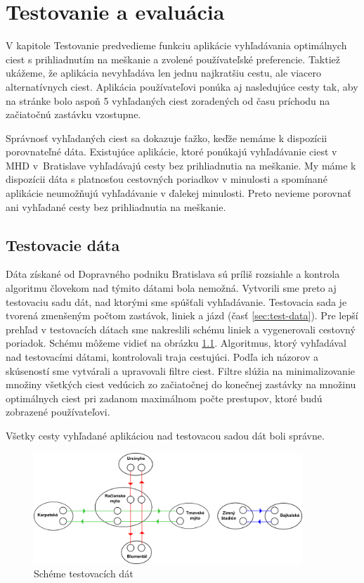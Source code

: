  \chapter{Testovanie a evaluácia}
\label{kap:tes}

V kapitole Testovanie predvedieme funkciu aplikácie vyhľadávania optimálnych ciest s prihliadnutím na meškanie a zvolené používateľské preferencie. Taktiež ukážeme, že aplikácia nevyhľadáva len jednu najkratšiu cestu, ale viacero alternatívnych ciest. Aplikácia používateľovi ponúka aj nasledujúce cesty tak, aby na stránke bolo aspoň 5 vyhľadaných ciest zoradených od času príchodu na začiatočnú zastávku vzostupne. 

Správnosť vyhľadaných ciest sa dokazuje ťažko, keďže nemáme k dispozícii porovnateľné dáta. Existujúce aplikácie, ktoré ponúkajú vyhľadávanie ciest v MHD v~Bratislave vyhľadávajú cesty bez prihliadnutia na meškanie. My máme k dispozícii dáta s platnosťou cestovných poriadkov v minulosti a spomínané aplikácie neumožňujú vyhľadávanie v ďalekej minulosti. Preto nevieme porovnať ani vyhľadané cesty bez prihliadnutia na meškanie.

\section{Testovacie dáta}

Dáta získané od Dopravného podniku Bratislava sú príliš rozsiahle a kontrola algoritmu človekom nad týmito dátami bola nemožná. Vytvorili sme preto aj testovaciu sadu dát, nad ktorými sme spúšťali vyhľadávanie. Testovacia sada je tvorená zmenšeným počtom zastávok, liniek a jázd (časť \ref{sec:test-data}). Pre lepší prehľad v testovacích dátach sme nakreslili schému liniek a vygenerovali cestovný poriadok. Schému môžeme vidieť na obrázku \ref{fig:test-schema}. Algoritmus, ktorý vyhľadával nad testovacími dátami, kontrolovali traja cestujúci. Podľa ich názorov a skúseností sme vytvárali a upravovali filtre ciest. Filtre slúžia na minimalizovanie množiny všetkých ciest vedúcich zo začiatočnej do konečnej zastávky na množinu optimálnych ciest pri zadanom maximálnom počte prestupov, ktoré budú zobrazené používateľovi. 

Všetky cesty vyhľadané aplikáciou nad testovacou sadou dát boli správne.

\begin{figure}[H]
\centerline{\includegraphics[width=0.9\textwidth]{images/test-schema}}
\caption[Schéma testovacích dát]{Schéme testovacích dát}
\label{fig:test-schema}
\end{figure}

